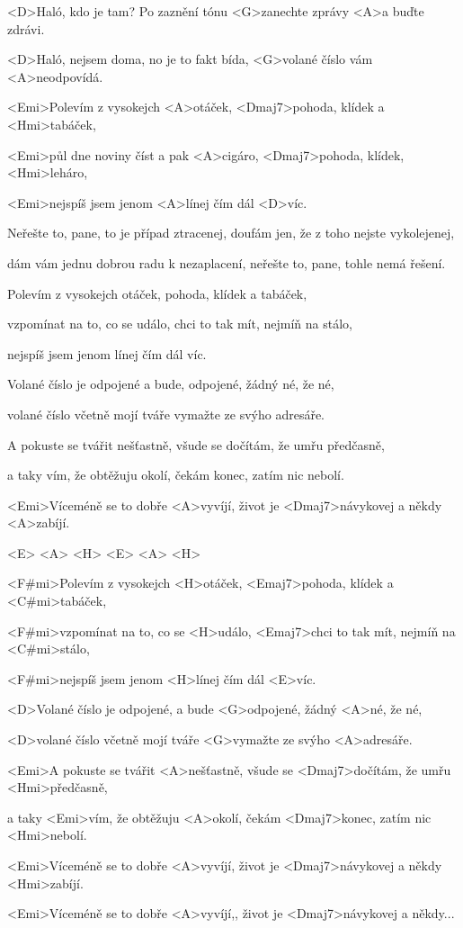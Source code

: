 
\zs
<D>Haló, kdo je tam? Po zaznění tónu
<G>zanechte zprávy <A>a buďte zdrávi.

<D>Haló, nejsem doma, no je to fakt bída,
<G>volané číslo vám <A>neodpovídá.
\ks

\zr
<Emi>Polevím z vysokejch <A>otáček,
<Dmaj7>pohoda, klídek a <Hmi>tabáček,

<Emi>půl dne {noviny} číst a pak <A>cigáro,
<Dmaj7>pohoda, klídek, <Hmi>leháro,

<Emi>nejspíš jsem jenom <A>línej čím dál <D>víc.
\kr

\zs
Neřešte to, pane, to je případ ztracenej,
doufám jen, že z toho nejste vykolejenej,

dám vám jednu dobrou radu k nezaplacení,
neřešte to, pane, tohle nemá řešení.

\ks

\zr
Polevím z vysokejch otáček,
pohoda, klídek a tabáček,

vzpomínat na to, co se událo,
chci to tak mít, nejmíň na stálo,

nejspíš jsem jenom línej čím dál víc.
\kr

\zs
Volané číslo je odpojené a bude,
odpojené, žádný né, že né,

volané číslo včetně mojí tváře
vymažte ze svýho adresáře.

\ks

\zr
A pokuste se tvářit nešťastně,
všude se dočítám, že umřu předčasně,

a taky vím, že obtěžuju okolí,
čekám konec, zatím nic nebolí.

<Emi>Víceméně se to dobře <A>vyvíjí,
život je <Dmaj7>návykovej a někdy <A>zabíjí.
\kr


<E> <A> <H> 
<E> <A> <H> 

\zr
<F#mi>Polevím z vysokejch <H>otáček,
<Emaj7>pohoda, klídek a <C#mi>tabáček,

<F#mi>vzpomínat na to, co se <H>událo,
<Emaj7>chci to tak mít, nejmíň na <C#mi>stálo,

<F#mi>nejspíš jsem jenom <H>línej čím dál <E>víc.
\kr

\zs
<D>Volané číslo je odpojené,
a bude <G>odpojené, žádný <A>né, že né,

<D>volané číslo včetně mojí tváře
<G>vymažte ze svýho <A>adresáře.

\ks

\zs
<Emi>A pokuste se tvářit <A>nešťastně,
všude se <Dmaj7>dočítám, že umřu <Hmi>předčasně,

a taky <Emi>vím, že obtěžuju <A>okolí,
čekám <Dmaj7>konec, zatím nic <Hmi>nebolí.
\ks

\zs
<Emi>Víceméně se to dobře <A>vyvíjí,
život je <Dmaj7>návykovej a někdy <Hmi>zabíjí.

<Emi>Víceméně se to dobře <A>vyvíjí,,
život je <Dmaj7>návykovej a někdy...
\ks
\kp

